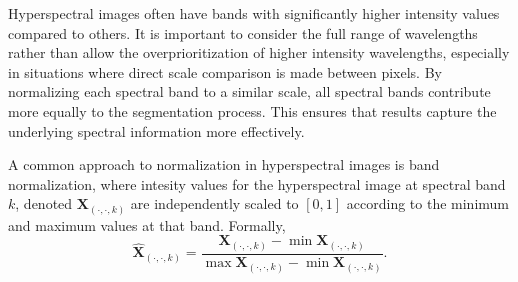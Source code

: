 Hyperspectral images often have bands with significantly higher intensity values compared to others. It is important to consider the full range of wavelengths rather than allow the overprioritization of higher intensity wavelengths, especially in situations where direct scale comparison is made between pixels. By normalizing each spectral band to a similar scale, all spectral bands contribute more equally to the segmentation process. This ensures that results capture the underlying spectral information more effectively. 

A common approach to normalization in hyperspectral images is band normalization, where intesity values for the hyperspectral image at spectral band $k$, denoted $\mathbf{X}_{(\cdot, \cdot, k)}$ are independently scaled to $[0,1]$ according to the minimum and maximum values at that band. Formally,
\begin{equation}
    \label{alg:normalization}
    \hat{\mathbf{X}}_{(\cdot, \cdot, k)} =  \frac{\mathbf{X}_{(\cdot, \cdot, k)} - \min\mathbf{X}_{(\cdot, \cdot, k)}}{\max\mathbf{X}_{(\cdot, \cdot, k)} - \min\mathbf{X}_{(\cdot, \cdot, k)}}.
\end{equation}
